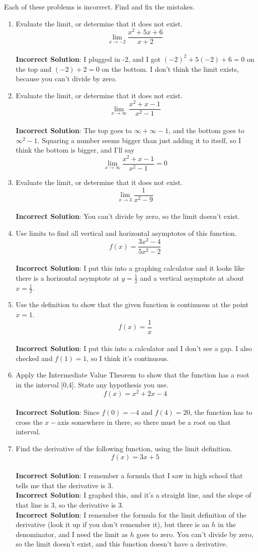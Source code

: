 \documentclass[11pt]{article}
\begin{document}
Each of these problems is incorrect. Find and fix the mistakes.
\begin{enumerate}
\item
Evaluate the limit, or determine that it does not exist.
$$\lim_{x \rightarrow -2} \frac{x^2 + 5x + 6}{x+2}$$
\\ \textbf{Incorrect Solution}: I plugged in -2, and I got $(-2)^2 + 5(-2) + 6 = 0$ on the top and $(-2) + 2 = 0$ on the bottom. I don't think the limit exists, because you can't divide by zero.
\item
Evaluate the limit, or determine that it does not exist.
$$\lim_{x\rightarrow \infty} \frac{x^2 + x - 1}{x^2 - 1}$$
\\ \textbf{Incorrect Solution}: The top goes to $\infty + \infty - 1$, and the bottom goes to $\infty^2 - 1$. Squaring a number seems bigger than just adding it to itself, so I think the bottom is bigger, and I'll say $$\lim_{x\rightarrow \infty} \frac{x^2 + x - 1}{x^2 - 1} = 0$$
\item 
Evaluate the limit, or determine that it does not exist.
$$\lim_{x \rightarrow 3}  \frac{1}{x^2-9}$$
\\ \textbf{Incorrect Solution}: You can't divide by zero, so the limit doesn't exist.
\item
Use limits to find all vertical and horizontal asymptotes of this function.
$$f(x) = \frac{3x^2 -4}{5x^2 -2}$$
\\ \textbf{Incorrect Solution}: I put this into a graphing calculator and it looks like there is a horizontal asymptote at $y = \frac{1}{2}$ and a vertical asymptote at about $x = \frac{1}{2}$.
\item
Use the definition to show that the given function is continuous at the point $x = 1$.
$$f(x) = \frac{1}{x}$$
\\ \textbf{Incorrect Solution}: I put this into a calculator and I don't see a gap. I also checked and $f(1) = 1$, so I think it's continuous.
\item
Apply the Intermediate Value Theorem to show that the function has a root in the interval [0,4]. State any hypothesis you use.
$$f(x) = x^2 + 2x -4$$
\\ \textbf{Incorrect Solution}: Since $f(0) = -4$ and $f(4) = 20$, the function has to cross the $x-$axis somewhere in there, so there must be a root on that interval.
\item
Find the derivative of the following function, using the limit definition.
$$f(x) = 3x+5$$
\\ \textbf{Incorrect Solution}: I remember a formula that I saw in high school that tells me that the derivative is 3.
\\ \textbf{Incorrect Solution}: I graphed this, and it's a straight line, and the slope of that line is 3, so the derivative is 3.
\\ \textbf{Incorrect Solution}: I remember the formula for the limit definition of the derivative (look it up if you don't remember it), but there is an $h$ in the denominator, and I need the limit as $h$ goes to zero. You can't divide by zero, so the limit doesn't exist, and this function doesn't have a derivative.
\end{enumerate}
\end{document}
